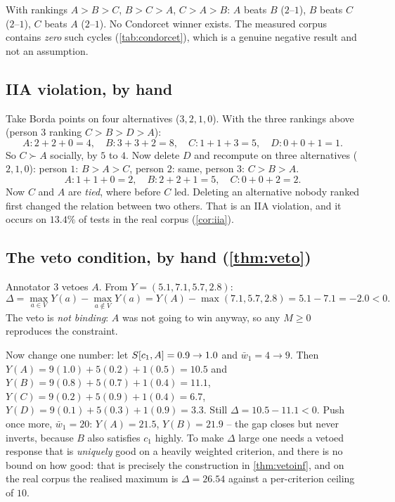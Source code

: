  With rankings
$A\!>\!B\!>\!C$, $B\!>\!C\!>\!A$, $C\!>\!A\!>\!B$: $A$ beats $B$ ($2$--$1$), $B$
beats $C$ ($2$--$1$), $C$ beats $A$ ($2$--$1$). No Condorcet winner exists. The
measured corpus contains \emph{zero} such cycles (\cref{tab:condorcet}), which is
a genuine negative result and not an assumption.

\subsection{IIA violation, by hand}

Take Borda points on four alternatives ($3,2,1,0$). With the three rankings above
(person $3$ ranking $C\!>\!B\!>\!D\!>\!A$):
\[
A: 2+2+0=4,\quad B: 3+3+2=8,\quad C: 1+1+3=5,\quad D: 0+0+1=1 .
\]
So $C \succ A$ socially, by $5$ to $4$. Now delete $D$ and recompute on three
alternatives ($2,1,0$): person $1$: $B\!>\!A\!>\!C$, person $2$: same, person
$3$: $C\!>\!B\!>\!A$.
\[
A: 1+1+0=2,\quad B: 2+2+1=5,\quad C: 0+0+2=2 .
\]
Now $C$ and $A$ are \emph{tied}, where before $C$ led. Deleting an alternative
nobody ranked first changed the relation between two others. That is an IIA
violation, and it occurs on $13.4\%$ of tests in the real corpus
(\cref{cor:iia}).

\subsection{The veto condition, by hand (\cref{thm:veto})}

Annotator $3$ vetoes $A$. From $Y=(5.1,7.1,5.7,2.8)$:
\[
\Delta = \max_{a\in V}Y(a) - \max_{a\notin V}Y(a) = Y(A) - \max(7.1,5.7,2.8) = 5.1-7.1 = -2.0 < 0 .
\]
The veto is \emph{not binding}: $A$ was not going to win anyway, so any $M\ge 0$
reproduces the constraint.

Now change one number: let $S[c_1,A]=0.9 \to 1.0$ and $\bar w_1 = 4 \to 9$.
Then $Y(A) = 9(1.0)+5(0.2)+1(0.5) = 10.5$ and
$Y(B) = 9(0.8)+5(0.7)+1(0.4)=11.1$, $Y(C)=9(0.2)+5(0.9)+1(0.4)=6.7$,
$Y(D)=9(0.1)+5(0.3)+1(0.9)=3.3$. Still $\Delta = 10.5-11.1 <0$. Push once more,
$\bar w_1 = 20$: $Y(A)=21.5$, $Y(B)=21.9$ -- the gap closes but never inverts,
because $B$ also satisfies $c_1$ highly. To make $\Delta$ large one needs a vetoed
response that is \emph{uniquely} good on a heavily weighted criterion, and there
is no bound on how good: that is precisely the construction in
\cref{thm:vetoinf}, and on the real corpus the realised maximum is
$\Delta = 26.54$ against a per-criterion ceiling of $10$.

